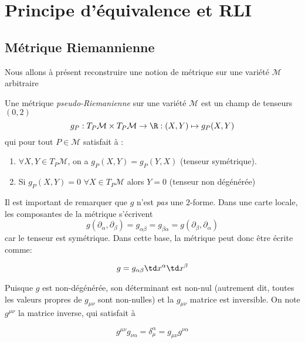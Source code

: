 \chapter{Principe d'équivalence et RLI}
\section{Métrique Riemannienne}
Nous allons à présent reconstruire une notion de métrique sur une variété $\mathcal{M}$ arbitraire

\begin{theoremframe}
    \begin{defi}
        Une métrique \textit{pseudo-Riemanienne} sur une variété $\mathcal{M}$ est un champ de tenseurs $(0, 2)$
        \begin{equation}
            g_P:T_P\mathcal{M} \times T_P\mathcal{M} \to \R: (X,Y) \mapsto g_P(X,Y)
        \end{equation}
        qui pour tout $P \in \mathcal{M}$ satisfait à :
        \begin{enumerate}
            \item $\forall X, Y \in T_P \mathcal{M}$, on a $g_P(X, Y) = g_P(Y, X)$ (tenseur symétrique).
            \item Si $g_P(X, Y) = 0$ $\forall X \in T_P \mathcal{M}$ alors $Y = 0$ (tenseur non dégénérée)
        \end{enumerate}
    \end{defi}
\end{theoremframe}
Il est important de remarquer que $g$ n'est \emph{pas} une $2$-forme. Dans une carte locale, les composantes de la métrique s'écrivent
\begin{equation}
g(\partial_{\alpha}, \partial_{\beta}) = g_{\alpha \beta} = g_{\beta \alpha} = g(\partial_{\beta}, \partial_{\alpha})
\end{equation}
car le tenseur est symétrique. Dans cette base, la métrique peut donc être écrite comme:

 \begin{equation}
     g = g_{\alpha \beta}\td x^{\alpha}\td x^{\beta}
 \end{equation}

 Puisque $g$ est non-dégénérée, son déterminant est non-nul (autrement dit, toutes les valeurs propres de $g_{\mu \nu}$ sont non-nulles) et la $g_{\mu \nu}$ matrice est inversible. On note $g^{\mu \nu}$ la matrice inverse, qui satisfait à

 \begin{equation}
     \boxed{g^{\mu \nu}g_{\nu \alpha} = \delta_{\mu}^{\alpha} = g_{\mu \nu}g^{\nu \alpha}}
 \end{equation}

